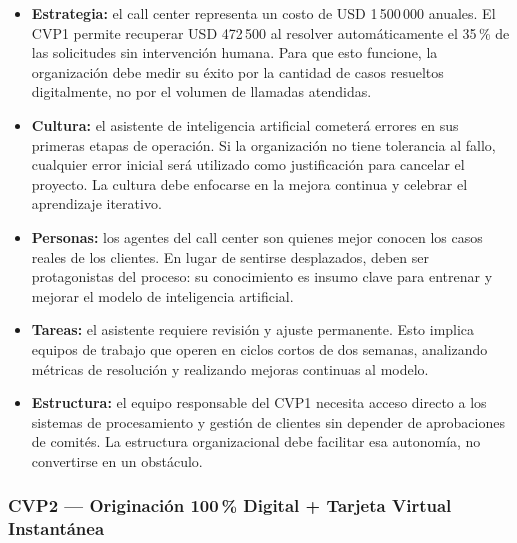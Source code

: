 \documentclass[12pt,letterpaper]{article}
\begin{document}
\begin{itemize}
  \item \textbf{Estrategia:} el call center representa un costo de USD 1\,500\,000 anuales.
    El CVP1 permite recuperar USD 472\,500 al resolver automáticamente el 35\,\% de las
    solicitudes sin intervención humana. Para que esto funcione, la organización debe medir su
    éxito por la cantidad de casos resueltos digitalmente, no por el volumen de llamadas
    atendidas.
  \item \textbf{Cultura:} el asistente de inteligencia artificial cometerá errores en sus
    primeras etapas de operación. Si la organización no tiene tolerancia al fallo, cualquier
    error inicial será utilizado como justificación para cancelar el proyecto. La cultura debe
    enfocarse en la mejora continua y celebrar el aprendizaje iterativo.
  \item \textbf{Personas:} los agentes del call center son quienes mejor conocen los casos
    reales de los clientes. En lugar de sentirse desplazados, deben ser protagonistas del
    proceso: su conocimiento es insumo clave para entrenar y mejorar el modelo de inteligencia
    artificial.
  \item \textbf{Tareas:} el asistente requiere revisión y ajuste permanente. Esto implica
    equipos de trabajo que operen en ciclos cortos de dos semanas, analizando métricas de
    resolución y realizando mejoras continuas al modelo.
  \item \textbf{Estructura:} el equipo responsable del CVP1 necesita acceso directo a los
    sistemas de procesamiento y gestión de clientes sin depender de aprobaciones de comités.
    La estructura organizacional debe facilitar esa autonomía, no convertirse en un obstáculo.
\end{itemize}

\subsubsection*{CVP2 — Originación 100\,\% Digital + Tarjeta Virtual Instantánea}
\end{document}
